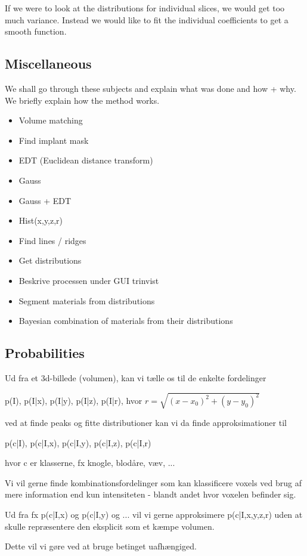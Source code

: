 If we were to look at the distributions for individual slices, we would get too much variance.
Instead we would like to fit the individual coefficients to get a smooth function.

\subsection*{Miscellaneous}

We shall go through these subjects and explain what was done and how + why. We briefly explain how the method works.

\begin{itemize}
 \item Volume matching
 \item Find implant mask
 \item EDT (Euclidean distance transform)
 \item Gauss
 \item Gauss + EDT
 \item Hist(x,y,z,r)
 \item Find lines / ridges
 \item Get distributions
 \item Beskrive processen under GUI trinvist
 \item Segment materials from distributions
 \item Bayesian combination of materials from their distributions
\end{itemize}

\subsection*{Probabilities}


Ud fra et 3d-billede (volumen), kan vi tælle os til de enkelte fordelinger

p(I), p(I|x), p(I|y), p(I|z), p(I|r), hvor $r=\sqrt{(x-x_0)^2+(y-y_0)^2}$

ved at finde peaks og fitte distributioner kan vi da finde approksimationer til

p(c|I), p(c|I,x), p(c|I,y), p(c|I,z), p(c|I,r)

hvor c er klasserne, fx knogle, blodåre, væv, ... 

Vi vil gerne finde kombinationsfordelinger som kan klassificere voxels ved brug af mere information end kun intensiteten - blandt andet hvor voxelen befinder sig.

Ud fra fx p(c|I,x) og p(c|I,y) og ... vil vi gerne approksimere p(c|I,x,y,z,r) uden at skulle repræsentere den eksplicit som et kæmpe volumen.

Dette vil vi gøre ved at bruge betinget uafhængiged. 
